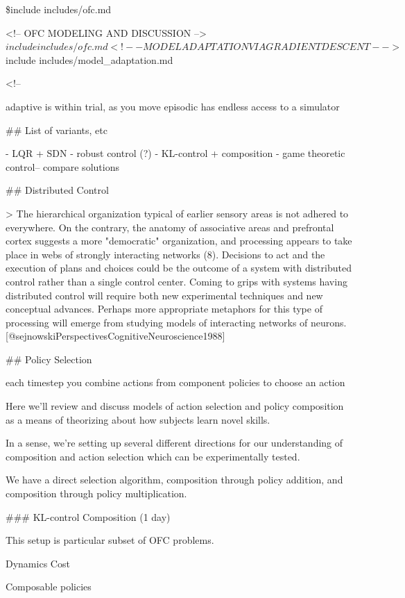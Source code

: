 \documentclass[../main.tex]{subfiles}
\begin{document}
{{{  \$include includes/ofc.md
  
  <!-- OFC MODELING AND DISCUSSION -->
  $include includes/ofc.md
  
  <!-- MODEL ADAPTATION VIA GRADIENT DESCENT -->
  $include includes/model_adaptation.md
  
  
  <!-- 
  
  adaptive is within trial, as you move
  episodic has endless access to a simulator
  
  ## List of variants, etc 
  
  - LQR + SDN
  - robust control (?)
  - KL-control + composition
  - game theoretic control-- compare solutions
  
  ## Distributed Control
  
  > The hierarchical organization typical of earlier sensory areas is not adhered to everywhere. On the contrary, the anatomy of associative areas and prefrontal  cortex suggests a more "democratic"  organization, and  processing  appears to take place  in webs of strongly interacting networks (8). Decisions to act and the execution of plans and  choices  could be the outcome of a  system with  distributed control rather than  a single control center. Coming to grips  with systems having distributed control will require both new experimental techniques and new  conceptual advances. Perhaps more  appropriate  metaphors for this  type of processing will emerge from studying  models of interacting  networks of neurons. [@sejnowskiPerspectivesCognitiveNeuroscience1988]
  
  ## Policy Selection
  
  each timestep you combine actions from component policies to choose an action
  
  Here we'll review and discuss models of action selection and policy composition as a means of theorizing about how subjects learn novel skills. 
  
  In a sense, we're setting up several different directions for our understanding of composition and action selection which can be experimentally tested. 
  
  We have a direct selection algorithm, composition through policy addition, and composition through policy multiplication. 
  
  
  ### KL-control Composition (1 day)
  
  This setup is particular subset of OFC problems. 
  
  Dynamics
  Cost
  
  Composable policies
  
}}}
\end{document}
